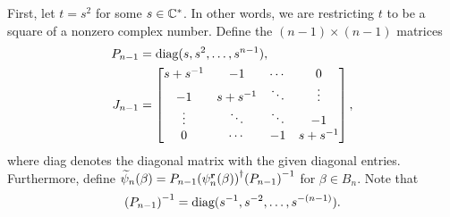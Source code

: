 
First, let $t=s^2$ for some $s\in\mathbb{C}^*$. In other words, we are restricting $t$ to be a square of a nonzero complex number. Define the $(n-1)\times (n-1)$ matrices
\begin{align}
    P_{n-1} &= \textrm{diag}(s,s^2,\dots,s^{n-1}), \\
    J_{n-1} &= \begin{bmatrix}
        s+{ s }^{-1} & -1 & \cdots & 0 \\
        -1 & s+{ s }^{-1} & \ddots & \vdots \\
        \vdots & \ddots & \ddots & -1 \\
        0 & \cdots & -1 & s+{ s }^{-1}
    \end{bmatrix},
\end{align}
where diag denotes the diagonal matrix with the given diagonal entries. Furthermore, define $\widetilde{\psi}_n(\beta) = P_{n-1}{\left( \psi_n^\mathbf{r}(\beta) \right)}^\dagger{ \left( P_{n-1} \right) }^{-1}$ for $\beta\in B_n$. Note that
\begin{align*}
    { \left( P_{n-1} \right) }^{-1} = \textrm{diag}(s^{-1},s^{-2},\dots,s^{-(n-1)}).
\end{align*}


